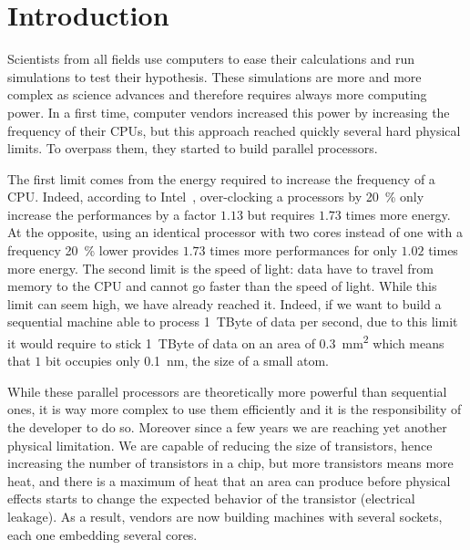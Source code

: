 \chapter{Introduction}

Scientists from all fields use computers to ease their calculations and run simulations to test their hypothesis.
These simulations are more and more complex as science advances and therefore requires always more computing power.
In a first time, computer vendors increased this power by increasing the frequency of their \glspl{CPU}, but this approach reached quickly several hard physical limits.
To overpass them, they started to build parallel processors.

The first limit comes from the energy required to increase the frequency of a \gls{CPU}.
Indeed, according to \gls{Intel}~\cite{Ganesan16Introduction}, over-clocking a processors by \SI{20}{\%} only increase the performances by a factor $1.13$ but requires $1.73$ times more energy.
At the opposite, using an identical processor with two cores instead of one with a frequency \SI{20}{\%} lower provides $1.73$ times more performances for only $1.02$ times more energy.
The second limit is the speed of light: data have to travel from memory to the \gls{CPU} and cannot go faster than the speed of light.
While this limit can seem high, we have already reached it.
Indeed, if we want to build a sequential machine able to process \SI{1}{TByte} of data per second, due to this limit it would require  to stick \SI{1}{TByte} of data on an area of \SI{0.3}{mm^2} which means that $1$ bit occupies only \SI{0.1}{nm}, the size of a small atom.

While these parallel processors are theoretically more powerful than sequential ones, it is way more complex to use them efficiently and it is the responsibility of the developer to do so.
Moreover since a few years we are reaching yet another physical limitation.
We are capable of reducing the size of transistors, hence increasing the number of transistors in a chip, but more transistors means more heat, and there is a maximum of heat that an area can produce before physical effects starts to change the expected behavior of the transistor (electrical leakage).
As a result, vendors are now building machines with several sockets, each one embedding several cores.

